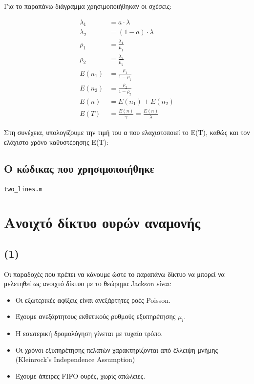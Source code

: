 \documentclass[a4paper]{article}
\begin{document}
Για το παραπάνω διάγραμμα χρησιμοποιήθηκαν οι σχέσεις:

\begin{align*}
	λ_1 &= a \cdot λ \\
	λ_2 &= (1-a) \cdot λ \\
	ρ_1 &= \frac{λ_1}{μ_1} \\
	ρ_2 &= \frac{λ_2}{μ_2} \\
	E(n_1) &= \frac{ρ_1}{1-ρ_1} \\
	E(n_2) &= \frac{ρ_2}{1-ρ_2} \\
	E(n) &= E(n_1) + E(n_2) \\
	E(T) &= \frac{E(n)}{γ} = \frac{E(n)}{λ}
\end{align*}

Στη συνέχεια, υπολογίζουμε την τιμή του α που ελαχιστοποιεί το E(T), καθώς και τον ελάχιστο χρόνο καθυστέρησης E(T):



\subsection*{Ο κώδικας που χρησιμοποιήθηκε}

\texttt{two\_lines.m}


\section*{Ανοιχτό δίκτυο ουρών αναμονής}

\subsection*{(1)}

Οι παραδοχές που πρέπει να κάνουμε ώστε το παραπάνω δίκτυο να μπορεί να μελετηθεί ως ανοιχτό δίκτυο με το θεώρημα Jackson είναι:

\begin{itemize}
	\item Οι εξωτερικές αφίξεις είναι ανεξάρτητες ροές Poisson.
	\item Έχουμε ανεξάρτητους εκθετικούς ρυθμούς εξυπηρέτησης $μ_i$.
	\item Η εσωτερική δρομολόγηση γίνεται με τυχαίο τρόπο.
	\item Οι χρόνοι εξυπηρέτησης πελατών χαρακτηρίζονται από έλλειψη μνήμης (Kleinrock's Independence Assumption)
	\item Έχουμε άπειρες FIFO ουρές, χωρίς απώλειες.
\end{itemize}
\end{document}
